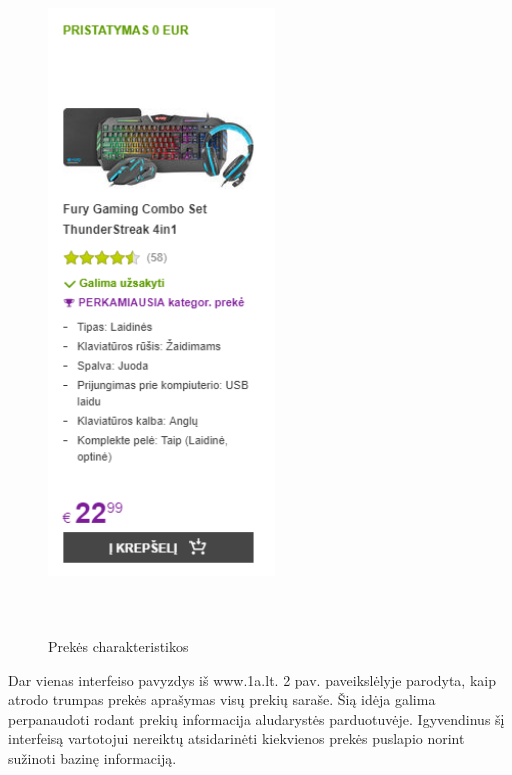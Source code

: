 \documentclass[oneside]{VUMIFPSkursinis}
\begin{document}
	
		  \begin{figure}[h]
			\centering
			\includegraphics[width=6cm,height=18cm,keepaspectratio]{IkvepiantisInterfeisas2.png}
			\caption{ Prekės charakteristikos}
		\end{figure}

			Dar vienas interfeiso pavyzdys iš www.1a.lt. 2 pav.
			 paveikslėlyje parodyta, kaip atrodo trumpas prekės aprašymas visų prekių saraše.
			 Šią idėja galima perpanaudoti rodant prekių informacija aludarystės parduotuvėje.
			 Igyvendinus šį interfeisą vartotojui nereiktų atsidarinėti kiekvienos prekės puslapio norint sužinoti bazinę informaciją.

	\pagebreak
\end{document}
